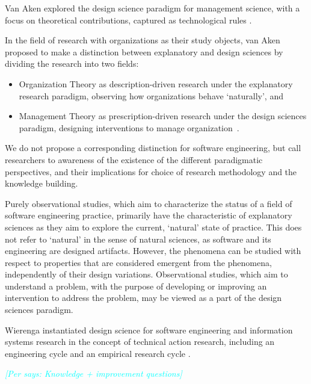 \documentclass[graybox]{svmult}
\newcommand{\per}[1]{\textcolor{cyan}{{\it [Per says: #1]}}}
\newcommand{\per}[1]{}
\begin{document}
Van Aken explored the design science paradigm for management science, with a focus on theoretical contributions, captured as technological rules \cite{van_aken_management_2004,van_aken_management_2005}. 

In the field of research with organizations as their study objects, van Aken proposed to make a distinction between explanatory and design sciences by dividing the research into two fields: 
\begin{itemize}
\item Organization Theory as description-driven research under the explanatory research paradigm, observing how organizations behave `naturally', and 
\item Management Theory as prescription-driven research under the design sciences paradigm, designing interventions to manage organization~\cite{van_aken_management_2004}.  
\end{itemize}

We do not propose a corresponding distinction for software engineering, but call researchers to awareness of the existence of the different paradigmatic perspectives, and their implications for choice of research methodology and the knowledge building.

Purely observational studies, which aim to characterize the status of a field of software engineering practice, primarily have the characteristic of explanatory sciences as they aim to explore the current, `natural'  state of practice. This does not refer to `natural' in the sense of natural sciences, as software and its engineering are designed artifacts. However, the phenomena can be studied with respect to properties that are considered emergent from the phenomena, independently of their design variations. Observational studies, which aim to understand a problem, with the purpose of developing or improving an intervention to address the problem, may be viewed as a part of the design sciences paradigm. 


Wierenga instantiated design science for software engineering and information systems research in the concept of technical action research, including an engineering cycle and an empirical research cycle \cite{wieringa_design_2009,wieringa_six_2015,wieringa_technical_2012,wieringa_what_2014}.

\per{Knowledge + improvement questions}

\end{document}

